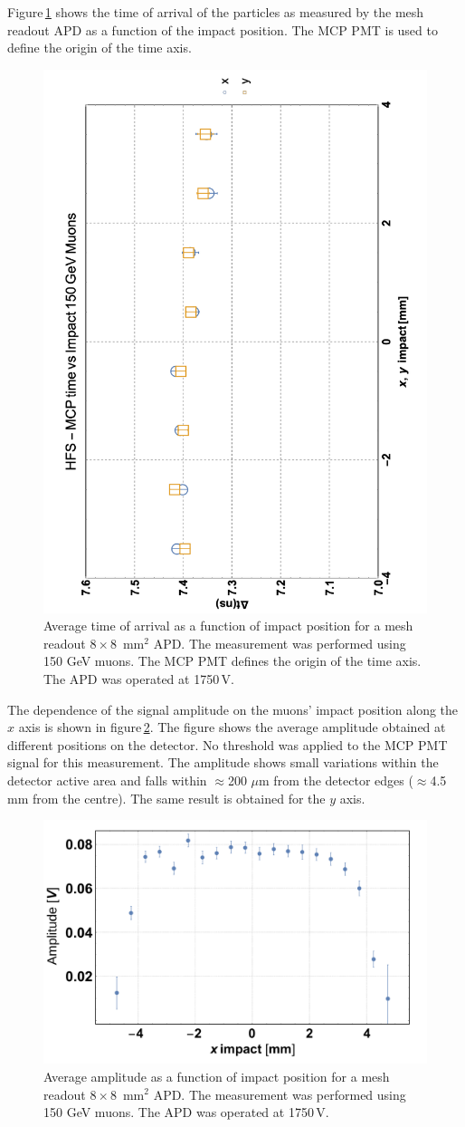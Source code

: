 \documentclass[review,number,sort&compress]{elsarticle}
\begin{document}
Figure\,\ref{fig:toa8x8impact} shows the time of arrival of the particles as measured by the mesh readout APD as a function of the impact position.
The MCP PMT is used to define the origin of the time axis.
\begin{figure}
  \centering
  \includegraphics[angle = -90, width = 0.6 \columnwidth]{toa8x8VsImpact}
  \caption{Average time of arrival as a function of impact position for a mesh readout $8 \times 8$~mm$^2$ APD. The measurement was performed using 150 GeV muons. The MCP PMT defines the origin of the time axis. The APD was operated at 1750\,V.}
  \label{fig:toa8x8impact}
\end{figure}

The dependence of the signal amplitude on the muons' impact position along the $x$ axis is shown in figure\,\ref{fig:ampli8x8impact}.
The figure shows the average amplitude obtained at different positions on the detector.
No threshold was applied to the MCP PMT signal for this measurement.
The amplitude shows small variations within the detector active area and falls within $\approx$200 $\mu$m from the detector edges ($\approx$4.5\,mm from the centre).
The same result is obtained for the $y$ axis.
\begin{figure}
  \centering
  \includegraphics[width = 0.6 \columnwidth]{ampli8x8vsImpact}
  \caption{Average amplitude as a function of impact position for a mesh readout $8 \times 8$~mm$^2$ APD. The measurement was performed using 150 GeV muons. The APD was operated at 1750\,V.}
  \label{fig:ampli8x8impact}
\end{figure}
\end{document}
